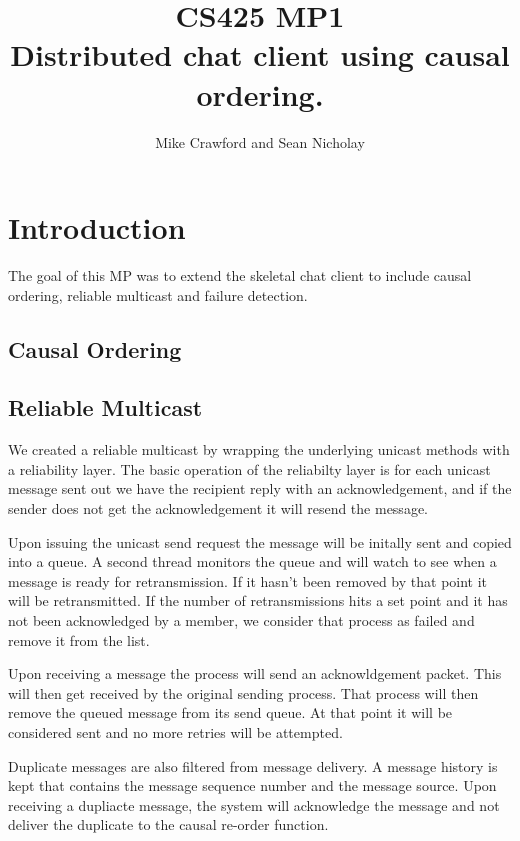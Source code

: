 \documentclass{article}
\begin{document}
\title{CS425 MP1 \\ \large Distributed chat client using causal ordering.}
\author{Mike Crawford and Sean Nicholay}

\maketitle

\section{Introduction}
The goal of this MP was to extend the skeletal chat client to include causal ordering, reliable multicast and failure detection.  

\subsection{Causal Ordering}

\subsection{Reliable Multicast}
We created a reliable multicast by wrapping the underlying unicast methods with a reliability layer.  The basic operation of the reliabilty layer is for each unicast message sent out we have the recipient reply with an acknowledgement, and if the sender does not get the acknowledgement it will resend the message.  

Upon issuing the unicast send request the message will be initally sent and copied into a queue.  A second thread monitors the queue and will watch to see when a message is ready for retransmission.  If it hasn't been removed by that point it will be retransmitted.  If the number of retransmissions hits a set point and it has not been acknowledged by a member, we consider that process as failed and remove it from the list.

Upon receiving a message the process will send an acknowldgement packet.  This will then get received by the original sending process.  That process will then remove the queued message from its send queue.  At that point it will be considered sent and no more retries will be attempted.

Duplicate messages are also filtered from message delivery.  A message history is kept that contains the message sequence number and the message source.  Upon receiving a dupliacte message, the system will acknowledge the message and not deliver the duplicate to the causal re-order function.
\end{document}

